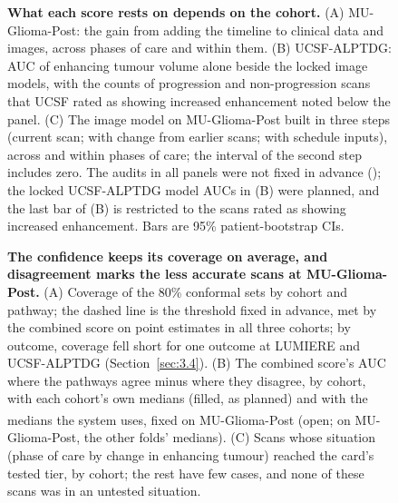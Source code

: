 \documentclass[largeformat]{interact} %
\newcommand{\expl}{\textsuperscript{\textdagger}}
\begin{document}
\begin{figure}[!htbp]
\centering
{}
\caption{\textbf{What each score rests on depends on the cohort.} (A) MU-Glioma-Post: the gain from adding the
timeline to clinical data and images, across phases of care and within them. (B) UCSF-ALPTDG: AUC of enhancing tumour
volume alone beside the locked image models, with the counts of progression and non-progression scans that UCSF rated
as showing increased enhancement noted below the panel. (C) The image model on MU-Glioma-Post built in three steps (current scan; with
change from earlier scans; with schedule inputs), across and within phases of care; the interval of the second step includes zero. The audits in all panels were not fixed in advance (\textdagger); the locked UCSF-ALPTDG model AUCs in (B) were
planned, and the last bar of (B) is restricted to the scans rated as showing increased enhancement.
Bars are 95\% patient-bootstrap CIs.}
\label{fig:3}
\end{figure}

\begin{figure}[!htbp]
\centering
{}
\caption{\textbf{The confidence keeps its coverage on average, and disagreement marks the less accurate scans at
MU-Glioma-Post.} (A) Coverage of the 80\% conformal sets by cohort and pathway; the dashed line is the threshold fixed
in advance, met by the combined score on point estimates in all three cohorts; by outcome, coverage fell short for one outcome at
LUMIERE and UCSF-ALPTDG (Section~\ref{sec:3.4}). (B) The combined score's AUC where
the pathways agree minus where they disagree, by cohort, with each cohort's own medians (filled, as planned) and with the medians the system uses, fixed on MU-Glioma-Post
(open\expl; on MU-Glioma-Post, the other folds' medians). (C) Scans whose situation (phase of care by change in
enhancing tumour) reached the card's tested tier, by cohort; the rest have few cases, and none of these scans was in an untested situation.}
\label{fig:4}
\end{figure}
\end{document}
